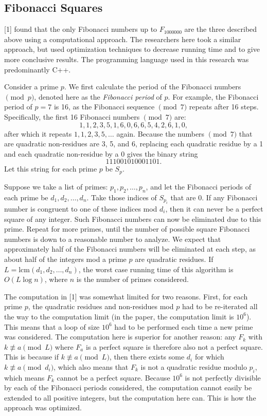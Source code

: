 \documentclass[11pt]{article}
\begin{document}
\subsection{Fibonacci Squares}
[1] found that the only Fibonacci numbers up to $F_{1000000}$ are the three described above using a computational approach. The researchers here took a similar approach, but used optimization techniques to decrease running time and to give more conclusive results. The programming language used in this research was predominantly C++.


Consider a prime $p$. We first calculate the period of the Fibonacci numbers $\pmod p$, denoted here as the \textit{Fibonacci period} of $p$. For example, the Fibonacci period of $p = 7$ is 16, as the Fibonacci sequence $\pmod 7$ repeats after 16 steps. Specifically, the first 16 Fibonacci numbers $\pmod{7}$ are: \[ 1, 1, 2, 3, 5, 1, 6, 0, 6, 6, 5, 4, 2, 6, 1, 0, \] after which it repeats $1, 1, 2, 3, 5, \dots$ again. Because the numbers $\pmod{7}$ that are quadratic non-residues are 3, 5, and 6, replacing each quadratic residue by a 1 and each quadratic non-residue by a 0 gives the binary string \[111001010001101.\] Let this string for each prime $p$ be $S_p$. 

Suppose we take a list of primes: $p_1, p_2, \dots , p_n$, and let the Fibonacci periods of each prime be $d_1, d_2, \dots , d_n$. Take those indices of $S_{p_i}$ that are 0. If any Fibonacci number is congruent to one of these indices mod $d_i$, then it can never be a perfect square of any integer. Such Fibonacci numbers can now be eliminated due to this prime. Repeat for more primes, until the number of possible square Fibonacci numbers is down to a reasonable number to analyze. We expect that approximately half of the Fibonacci numbers will be eliminated at each step, as about half of the integers mod a prime $p$ are quadratic residues. If $L = \text{lcm}(d_1,d_2,\dots,d_n)$, the worst case running time of this algorithm is $O(L\log n)$, where $n$ is the number of primes considered.

The computation in [1] was somewhat limited for two reasons. First, for each prime $p$, the quadratic residues and non-residues mod $p$ had to be re-iterated all the way to the computation limit (in the paper, the computation limit is $10^6$). This means that a loop of size $10^6$ had to be performed each time a new prime was considered. The computation here is superior for another reason: any $F_k$ with $k \not\equiv a \pmod L$ where $F_a$ is a perfect square is therefore also not a perfect square. This is because if $k \not\equiv a \pmod L$, then there exists some $d_i$ for which $k \not\equiv a \pmod d_i$, which also means that $F_k$ is not a quadratic residue modulo $p_i$, which means $F_k$ cannot be a perfect square. Because $10^6$ is not perfectly divisible by each of the Fibonacci periods considered, the computation cannot easily be extended to all positive integers, but the computation here can. This is how the approach was optimized.
\end{document}
